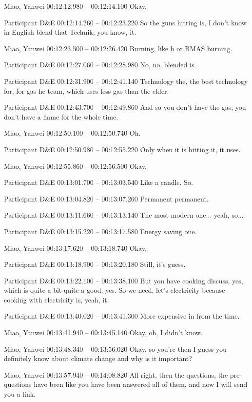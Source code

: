 {Miao, Yanwei 00:12:12.980 -- 00:12:14.100
Okay.

Participant D\&E 00:12:14.260 -- 00:12:23.220
So the guns hitting is, I don't know in English blend that Technik, you know, it.

Miao, Yanwei 00:12:23.500 -- 00:12:26.420
Burning, like b or BMAS burning.

Participant D\&E 00:12:27.060 -- 00:12:28.980
No, no, blended is.

Participant D\&E 00:12:31.900 -- 00:12:41.140
Technology the, the best technology for, for gas he team, which uses less gas than the elder.

Participant D\&E 00:12:43.700 -- 00:12:49.860
And so you don't have the gas, you don't have a flame for the whole time.

Miao, Yanwei 00:12:50.100 -- 00:12:50.740
Oh.

Participant D\&E 00:12:50.980 -- 00:12:55.220
Only when it is hitting it, it uses.

Miao, Yanwei 00:12:55.860 -- 00:12:56.500
Okay.

Participant D\&E 00:13:01.700 -- 00:13:03.540
Like a candle. So.

Participant D\&E 00:13:04.820 -- 00:13:07.260
Permanent permanent.

Participant D\&E 00:13:11.660 -- 00:13:13.140
The most modern one... yeah, so...

Participant D\&E 00:13:15.220 -- 00:13:17.580
Energy saving one.

Miao, Yanwei 00:13:17.620 -- 00:13:18.740
Okay.

Participant D\&E 00:13:18.900 -- 00:13:20.180
Still, it's guess.

Participant D\&E 00:13:22.100 -- 00:13:38.100
But you have cooking discuss, yes, which is quite a bit quite a good, yes. So we need, let's electricity because cooking with electricity is, yeah, it.

Participant D\&E 00:13:40.020 -- 00:13:41.300
More expensive in from the time.

Miao, Yanwei 00:13:41.940 -- 00:13:45.140
Okay, oh, I didn't know.

Miao, Yanwei 00:13:48.340 -- 00:13:56.020
Okay, so you're then I guess you definitely know about climate change and why is it important?

Miao, Yanwei 00:13:57.940 -- 00:14:08.820
All right, then the questions, the pre- questions have been like you have been answered all of them, and now I will send you a link.

}
